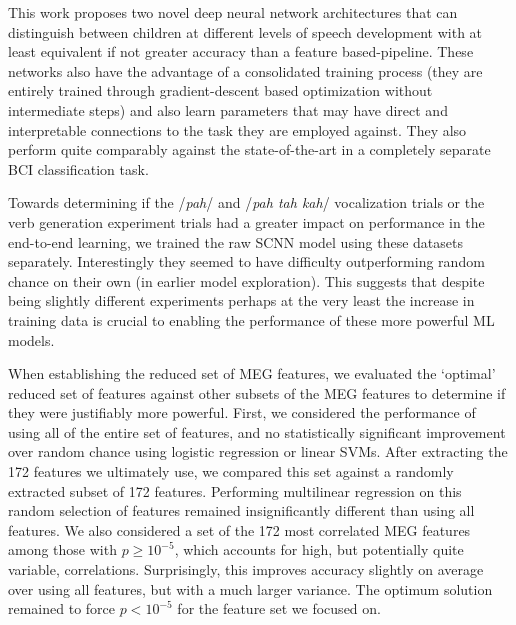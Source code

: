 \documentclass[fleqn,10pt]{wlscirep}
\begin{document}
This work proposes two novel deep neural network architectures that can distinguish between children at different levels of speech development with at least equivalent if not greater accuracy than a feature based-pipeline. These networks also have the advantage of a consolidated training process (they are entirely trained through gradient-descent based optimization without intermediate steps) and also learn parameters that may have direct and interpretable connections to the task they are employed against. They also perform quite comparably against the state-of-the-art in a completely separate BCI classification task. 


Towards determining if the /{\em pah}/ and /{\em pah tah kah}/ vocalization trials or the verb generation experiment trials had a greater impact on performance in the end-to-end learning, we trained the raw SCNN model using these datasets separately. Interestingly they seemed to have difficulty outperforming random chance on their own (in earlier model exploration). This suggests that despite being slightly different experiments perhaps at the very least the increase in training data is crucial to enabling the performance of these more powerful ML models.

When establishing the reduced set of MEG features, we evaluated the `optimal' reduced set of features against other subsets of the MEG features to determine if they were justifiably more powerful. First, we considered the performance of using all of the entire set of features, and no statistically significant improvement over random chance using logistic regression or linear SVMs. After extracting the 172 features we ultimately use, we compared this set against a randomly extracted subset of 172 features. Performing multilinear regression on this random selection of features remained insignificantly different than using all features. We also considered a set of the 172 most correlated MEG features among those with $p \geq 10^{-5}$, which accounts for high, but potentially quite variable, correlations. Surprisingly, this improves accuracy slightly on average over using all features, but with a much larger variance. The optimum solution remained to force $p<10^{-5}$ for the feature set we focused on. %
\end{document}
